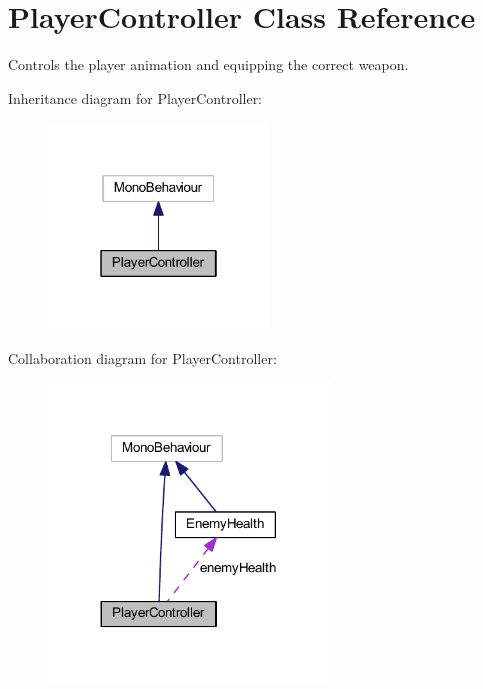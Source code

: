 \hypertarget{class_player_controller}{}\section{Player\+Controller Class Reference}
\label{class_player_controller}


Controls the player animation and equipping the correct weapon.  




Inheritance diagram for Player\+Controller\+:\nopagebreak
\begin{figure}[H]
\begin{center}
\leavevmode
\includegraphics[width=166pt]{class_player_controller__inherit__graph}
\end{center}
\end{figure}


Collaboration diagram for Player\+Controller\+:\nopagebreak
\begin{figure}[H]
\begin{center}
\leavevmode
\includegraphics[width=212pt]{class_player_controller__coll__graph}
\end{center}
\end{figure}
